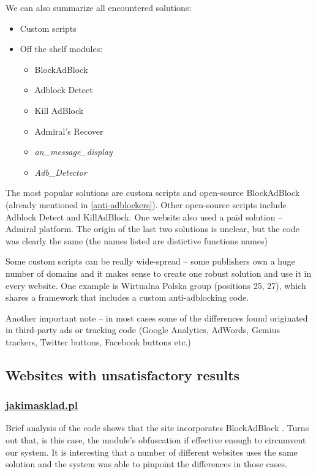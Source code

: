 We can also summarize all encountered solutions:
\begin{itemize}
  \item Custom scripts
  \item Off the shelf modules:
    \begin{itemize}
      \item BlockAdBlock \cite{github:blockadblock}
      \item Adblock Detect \cite{adblock-detect}
      \item Kill AdBlock \cite{kill-adblock}
      \item Admiral's Recover \cite{admiral:recover}
      \item \emph{an\_message\_display}
      \item \emph{Adb\_Detector}
    \end{itemize}
\end{itemize}

The most popular solutions are custom scripts and open-source BlockAdBlock (already mentioned in \ref{anti-adblockers}).
Other open-source scripts include Adblock Detect and KillAdBlock. One website also used a paid solution -- Admiral platform.
The origin of the last two solutions is unclear, but the code was clearly the same (the names listed are 
distictive functions names)

Some custom scripts can be really wide-spread -- some publishers own a huge number of domains and it makes 
sense to create one robust solution and use it in every website. One example is Wirtualna Polska group (positions 25, 27), which shares
a framework that includes a custom anti-adblocking code.

Another important note -- in most cases some of the differences found originated in third-party ads
or tracking code (Google Analytics, AdWords, Gemius trackers, Twitter buttons, Facebook buttons etc.)

\subsection{Websites with unsatisfactory results}

\subsubsection{\url{jakimasklad.pl}}
Brief analysis of the code shows that the site incorporates BlockAdBlock \cite{github:blockadblock}. 
Turns out that, is this case, the module's obfuscation if effective enough to circumvent our system.
It is interesting that a number of different websites uses the same solution and the system
was able to pinpoint the differences in those cases.


